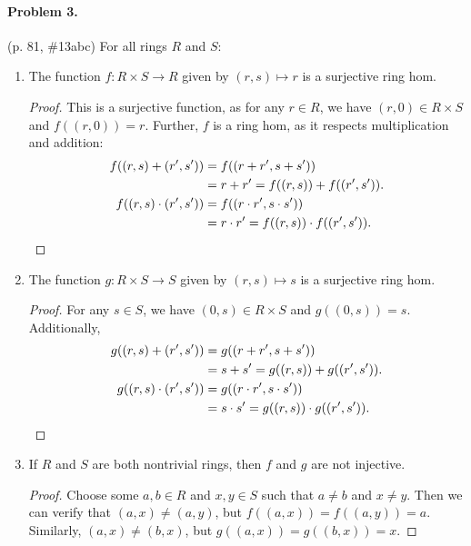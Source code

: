 \documentclass[12pt]{article}
\begin{document}
\paragraph{Problem 3.} (p. 81, \#13abc) For all rings $R$ and $S$:
\begin{enumerate}
\item[a.] {
    The function $f : R \times S \to R$ given by $(r, s) \mapsto r$ is a surjective ring hom.
    \begin{proof}
        This is a surjective function, as for any $r \in R$, we have $(r, 0) \in R \times S$ and $f((r, 0)) = r$. Further, $f$ is a ring hom, as it respects multiplication and addition:
        \begin{align*}
            f((r, s) + (r', s')) &= f((r + r', s + s')) \\ &= r + r' = f((r, s)) + f((r', s')). \\
            f((r, s) \cdot (r', s')) &= f((r \cdot r', s \cdot s')) \\ &= r \cdot r' = f((r, s)) \cdot f((r', s')). \qedhere
        \end{align*}
    \end{proof}
}
\item[b.] {
    The function $g : R \times S \to S$ given by $(r, s) \mapsto s$ is a surjective ring hom.
    \begin{proof}
        For any $s \in S$, we have $(0, s) \in R \times S$ and $g((0, s)) = s$. Additionally,
        \begin{align*}
             g((r, s) + (r', s')) &= g((r + r', s + s')) \\ &= s + s' = g((r, s)) + g((r', s')). \\
            g((r, s) \cdot (r', s')) &= g((r \cdot r', s \cdot s')) \\ &= s \cdot s' = g((r, s)) \cdot g((r', s')). \qedhere
        \end{align*}
    \end{proof}
}
\item[c.] {
    If $R$ and $S$ are both nontrivial rings, then $f$ and $g$ are not injective.
    \begin{proof}
        Choose some $a, b \in R$ and $x, y \in S$ such that $a \neq b$ and $x \neq y$. Then we can verify that $(a, x) \neq (a, y)$, but $f((a, x)) = f((a, y)) = a$. Similarly, $(a, x) \neq (b, x)$, but $g((a, x)) = g((b, x)) = x$.
    \end{proof}
}
\end{enumerate}
\end{document}
